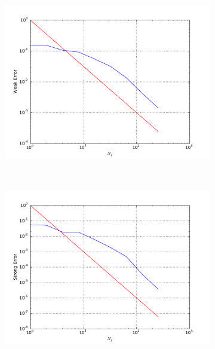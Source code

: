 \documentclass[11pt]{amsart}
\begin{document}
\begin{figure}
    \centering
    \begin{subfigure}[b]{0.4\textwidth}
        \includegraphics[width=\textwidth]{weakerr4.pdf}
    \end{subfigure}
    ~ %
    \begin{subfigure}[b]{0.4\textwidth}
        \includegraphics[width=\textwidth]{strongerr4.pdf}
    \end{subfigure}
    \\
        \begin{subfigure}[b]{0.4\textwidth}

\end{subfigure}
\end{figure}
\end{document}
